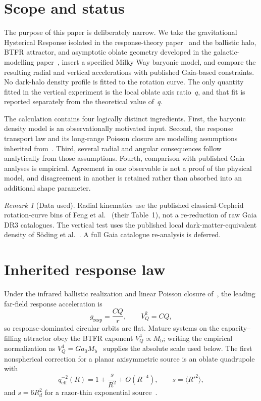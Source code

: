 \documentclass[11pt]{article}
\theoremstyle{definition}
\theoremstyle{remark}
\newtheorem{remark}[theorem]{Remark}
\newcommand{\Mb}{M_{\mathrm{b}}}
\newcommand{\qeff}{q_{\mathrm{eff}}}
\begin{document}
\section{Scope and status}
\label{sec:scope}
The purpose of this paper is deliberately narrow.
We take the gravitational Hysterical Response isolated in the response-theory paper~\cite{boyd2026response} and the ballistic halo, BTFR attractor, and asymptotic oblate geometry developed in the galactic-modelling paper~\cite{boyd2026galactic}, insert a specified Milky Way baryonic model, and compare the resulting radial and vertical accelerations with published Gaia-based constraints.
No dark-halo density profile is fitted to the rotation curve.
The only quantity fitted in the vertical experiment is the local oblate axis ratio~$q$, and that fit is reported separately from the theoretical value of~$q$.

The calculation contains four logically distinct ingredients.
First, the baryonic density model is an observationally motivated input.
Second, the response transport law and its long-range Poisson closure are modelling assumptions inherited from~\cite{boyd2026galactic}.
Third, several radial and angular consequences follow analytically from those assumptions.
Fourth, comparison with published Gaia analyses is empirical.
Agreement in one observable is not a proof of the physical model, and disagreement in another is retained rather than absorbed into an additional shape parameter.

\begin{remark}[Data used]
\label{rem:data}
Radial kinematics use the published classical-Cepheid rotation-curve bins of Feng et al.~\cite{Feng2026} (their Table~1), not a re-reduction of raw Gaia DR3 catalogues.
The vertical test uses the published local dark-matter-equivalent density of S\"oding et al.~\cite{Soding2025}.
A full Gaia catalogue re-analysis is deferred.
\end{remark}

\section{Inherited response law}
\label{sec:inherited}
Under the infrared ballistic realization and linear Poisson closure of~\cite{boyd2026galactic}, the leading far-field response acceleration is
\begin{equation}
  g_{\mathrm{resp}}=\frac{CQ}{r},
  \qquad V_Q^{2}=CQ,
\end{equation}
so response-dominated circular orbits are flat.
Mature systems on the capacity--filling attractor obey the BTFR exponent $V_Q^{4}\propto\Mb$; writing the empirical normalization as $V_Q^{4}=Ga_0\Mb$~\cite{mcgaugh2012,lelli2016} supplies the absolute scale used below.
The first nonspherical correction for a planar axisymmetric source is an oblate quadrupole with
\begin{equation}
  \qeff^{-2}(R)=1+\frac{s}{R^{2}}+O(R^{-4}),
  \qquad s=\langle R'^{2}\rangle,
\end{equation}
and $s=6R_d^{2}$ for a razor-thin exponential source~\cite{boyd2026galactic}.
\end{document}
